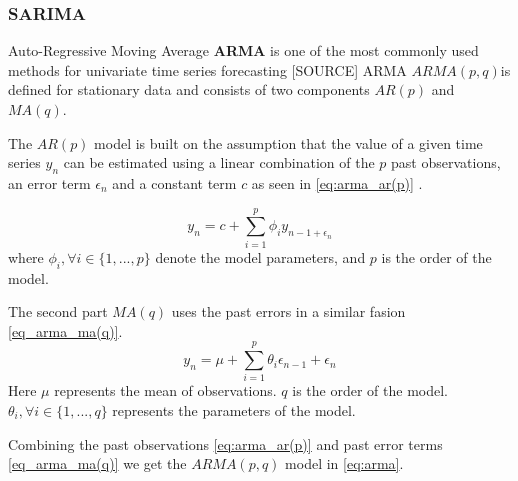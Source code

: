 




\subsubsection{SARIMA}
Auto-Regressive Moving Average \textbf{ARMA} is one of the most commonly used methods for univariate time series forecasting [SOURCE]
ARMA $ARMA(p, q)$is defined for stationary data and consists of two components $AR(p)$ and $MA(q)$.

The $AR(p)$ model is built on the assumption that the value of a given time series $y_n$ can be estimated using a linear combination
of the $p$ past observations, an error term $\epsilon_n$ and a constant term $c$ as seen in \autoref{eq:arma_ar(p)} \cite{Box2016}.

\begin{equation}
    \label{eq:arma_ar(p)}
    y_n = c + \sum_{i=1}^{p} \phi_i y_{n-1 + \epsilon_n}
\end{equation}
  where $\phi_i, \forall i \in \{1, ..., p\} $ denote the model parameters, and $p$ is the order of the model.

The second part $MA(q)$ uses the past errors in a similar fasion \autoref{eq_arma_ma(q)}.
\begin{equation}
    \label{eq_arma_ma(q)}
    y_n = \mu + \sum_{i=1}^{p} \theta_i \epsilon_{n-1} + \epsilon_n
\end{equation}
Here $\mu$ represents the mean of observations. $q$ is the order of the model. $\theta_i, \forall i \in \{1, ..., q\}$ represents the parameters of the model.

Combining the past observations \autoref{eq:arma_ar(p)} and past error terms \autoref{eq_arma_ma(q)} we get the $ARMA(p,q)$ model in \autoref{eq:arma}.

